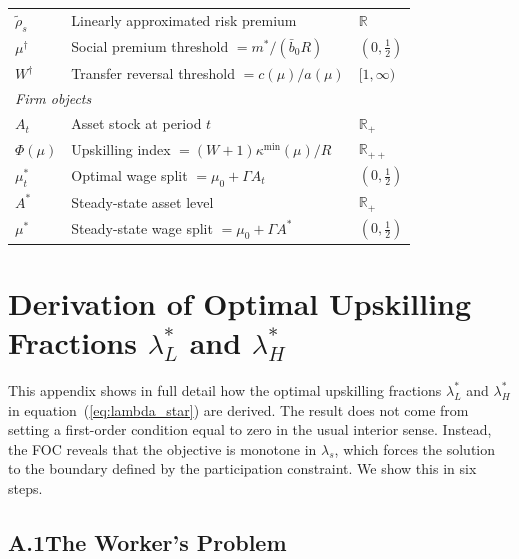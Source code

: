 \documentclass[12pt,a4paper]{article}
\begin{document}
\begin{table}[h!]
\begin{tabular}{lp{8.2cm}l}
$\tilde\rho_s$     & Linearly approximated risk premium              & $\mathbb{R}$ \\
$\mu^\dagger$      & Social premium threshold $= m^*/(\bar{b}_0 R)$  & $(0,\tfrac{1}{2})$ \\
$W^\dagger$        & Transfer reversal threshold $= c(\mu)/a(\mu)$   & $[1,\infty)$ \\
\midrule
\multicolumn{3}{l}{\textit{Firm objects}} \\
$A_t$         & Asset stock at period $t$                           & $\mathbb{R}_{+}$ \\
$\Phi(\mu)$   & Upskilling index $= (W+1)\kappa^{\min}(\mu)/R$     & $\mathbb{R}_{++}$ \\
$\mu_t^*$     & Optimal wage split $= \mu_0+\Gamma A_t$             & $(0,\tfrac{1}{2})$ \\
$A^*$         & Steady-state asset level                            & $\mathbb{R}_{+}$ \\
$\mu^*$       & Steady-state wage split $= \mu_0+\Gamma A^*$        & $(0,\tfrac{1}{2})$ \\
\bottomrule
\end{tabular}
\end{table}

\newpage
\appendix
\setcounter{section}{1} %
\section{Derivation of Optimal Upskilling Fractions $\lambda_L^*$ and $\lambda_H^*$}
\label{app:foc}

This appendix shows in full detail how the optimal upskilling fractions
$\lambda_L^*$ and $\lambda_H^*$ in equation~(\ref{eq:lambda_star}) are
derived. The result does not come from setting a first-order condition
equal to zero in the usual interior sense. Instead, the FOC reveals that
the objective is monotone in $\lambda_s$, which forces the solution to
the boundary defined by the participation constraint. We show this in
six steps.

\subsection*{A.1\quad The Worker's Problem}
\end{document}
